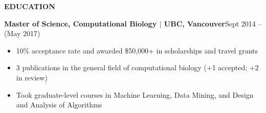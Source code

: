 \documentclass{res}
\renewcommand{\section}[1]{%
  \vspace{0.3in}%
  \centerline{\uppercase{\bf{#1}}}%
  \vspace{-6pt}}
\begin{document}
\begin{resume}
\vspace{-1em}
\section{Education}
{\bf Master of Science, Computational Biology $|$ UBC, Vancouver}\hfill{Sept 2014 -- (May 2017)}
\begin{itemize}
  \item 10\% acceptance rate and awarded \$50,000+ in scholarships and travel grants
  \item 3 publications in the general field of computational biology (+1 accepted; +2 in review)
  \item Took graduate-level courses in Machine Learning, Data Mining, and Design and Analysis of Algorithms
\end{itemize}
\pagebreak

\end{resume}
\end{document}
